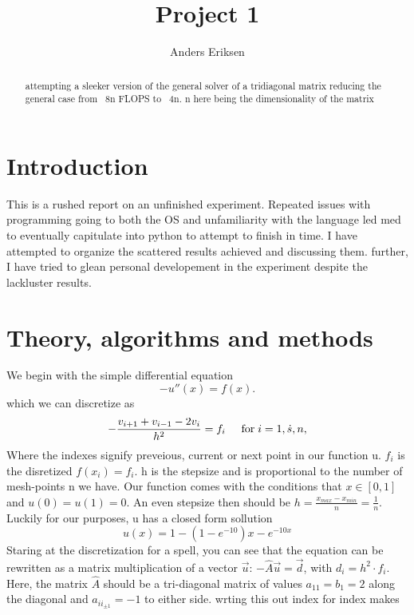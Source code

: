 \documentclass[10pt,showpacs,preprintnumbers,footinbib,amsmath,amssymb,aps,prl,twocolumn,groupedaddress,superscriptaddress,showkeys]{revtex4-1}
\begin{document}
\title{Project 1}
\author{Anders Eriksen}
\begin{abstract}
attempting a sleeker version of the general solver of a tridiagonal matrix reducing the general case from ~8n FLOPS to ~4n. n here being the dimensionality of the matrix
\end{abstract}
\maketitle

\section{Introduction}
This is a rushed report on an unfinished experiment. Repeated issues with programming going to both the OS and unfamiliarity with the language led med to eventually capitulate into python to attempt to finish in time. I have attempted to organize the scattered results achieved and discussing them. further, I have tried to glean personal developement in the experiment despite the lackluster results. 

\section{Theory, algorithms and methods}
We begin with the simple differential equation 
\begin{equation*}
-u''(x) = f(x).
\end{equation*}
which we can discretize as 
\begin{equation*}
   -\frac{v_{i+1}+v_{i-1}-2v_i}{h^2} = f_i  \hspace{0.5cm} \mathrm{for} \hspace{0.1cm} i=1,\dot    s, n,
\end{equation*}
Where the indexes signify preveious, current or next point in our function u. $f_i$ is the disretized $f(x_i) = f_i$. h is the stepsize and is proportional to the number of mesh-points n we have. Our function comes with the conditions that $x \in [0,1]$ and $u(0)=u(1)=0$. An even stepsize then should be $h = \frac{x_{max}- x_{min}}{n} = \frac{1}{n}$. Luckily for our purposes, u has a closed form sollution 
\begin{equation*}
	u(x) = 1-(1-e^{-10})x-e^{-10x}
\end{equation*}
Staring at the discretization for a spell, you can see that the equation can be rewritten as a matrix multiplication of a vector $\vec{u}$: $-\hat{A}\vec{u}=\vec{d}$, with $d_i = h^2\cdot f_i$.  Here, the matrix $\hat{A}$ should be a tri-diagonal matrix of values $a_{11} = b_1 = 2$ along the diagonal and $a_{ii_{\pm 1}} = -1$ to either side. wrting this out index for index makes
\end{document}
